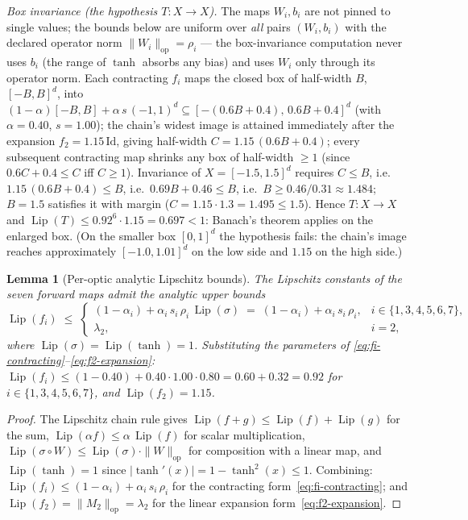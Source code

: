 \documentclass[11pt,a4paper]{article}
\theoremstyle{plain}
\newtheorem{lemma}[theorem]{Lemma}
\theoremstyle{definition}
\theoremstyle{remark}
\DeclareMathOperator{\Lip}{Lip}
\begin{document}
\emph{Box invariance (the hypothesis $T:X\to X$).} The maps
$W_{i}, b_{i}$ are not pinned to single values; the bounds below are
uniform over \emph{all} pairs $(W_{i}, b_{i})$ with the declared
operator norm $\|W_{i}\|_{\mathrm{op}}=\rho_{i}$ --- the
box-invariance computation never uses $b_{i}$ (the range of
$\tanh$ absorbs any bias) and uses $W_{i}$ only through its operator
norm. Each contracting $f_{i}$ maps the closed box of half-width
$B$, $[-B,B]^{d}$, into
$(1-\alpha)[-B,B]+\alpha\,s\,(-1,1)^{d}\subseteq
[-(0.6B+0.4),\,0.6B+0.4]^{d}$ (with $\alpha=0.40$, $s=1.00$); the
chain's widest image is attained immediately after the expansion
$f_{2}=1.15\,\mathrm{Id}$, giving half-width
$C=1.15\,(0.6B+0.4)$; every subsequent contracting map shrinks any
box of half-width $\geq 1$ (since $0.6C+0.4\leq C$ iff $C\geq 1$).
Invariance of $X=[-1.5,1.5]^{d}$ requires $C\leq B$, i.e.\
$1.15\,(0.6B+0.4)\leq B$, i.e.\ $0.69B+0.46\leq B$, i.e.\
$B\geq 0.46/0.31\approx 1.484$; $B=1.5$ satisfies it with margin
($C=1.15\cdot 1.3=1.495\leq 1.5$). Hence $T:X\to X$ and
$\Lip(T)\leq 0.92^{6}\cdot 1.15=0.697<1$: Banach's theorem applies
on the enlarged box. (On the smaller box $[0,1]^{d}$ the hypothesis
fails: the chain's image reaches approximately $[-1.0,1.01]^{d}$ on
the low side and $1.15$ on the high side.)

\begin{lemma}[Per-optic analytic Lipschitz bounds]
\label{lem:lip-per-optic}
The Lipschitz constants of the seven forward maps admit the analytic
upper bounds
\begin{equation}\label{eq:lip-per-optic}
  \Lip(f_{i}) \;\leq\;
  \begin{cases}
  (1-\alpha_{i})+\alpha_{i}\,s_{i}\,\rho_{i}\,\Lip(\sigma)
   \;=\; (1-\alpha_{i})+\alpha_{i}\,s_{i}\,\rho_{i},
   & i\in\{1,3,4,5,6,7\},\\[4pt]
  \lambda_{2}, & i=2,
  \end{cases}
\end{equation}
where $\Lip(\sigma)=\Lip(\tanh)=1$. Substituting the parameters of
\eqref{eq:fi-contracting}--\eqref{eq:f2-expansion}:
$\Lip(f_{i})\leq (1-0.40)+0.40\cdot 1.00\cdot 0.80 = 0.60+0.32=0.92$
for $i\in\{1,3,4,5,6,7\}$, and $\Lip(f_{2})=1.15$.
\end{lemma}

\begin{proof}
The Lipschitz chain rule gives $\Lip(f+g)\leq \Lip(f)+\Lip(g)$ for the
sum, $\Lip(\alpha f)\leq \alpha\,\Lip(f)$ for scalar multiplication,
$\Lip(\sigma\circ W)\leq \Lip(\sigma)\cdot\|W\|_{\mathrm{op}}$ for
composition with a linear map, and $\Lip(\tanh)=1$ since
$|\tanh'(x)|=1-\tanh^{2}(x)\leq 1$. Combining:
$\Lip(f_{i})\leq (1-\alpha_{i})+\alpha_{i}\,s_{i}\,\rho_{i}$ for the
contracting form~\eqref{eq:fi-contracting}; and $\Lip(f_{2})=
\|M_{2}\|_{\mathrm{op}}=\lambda_{2}$ for the linear expansion
form~\eqref{eq:f2-expansion}.
\end{proof}
\end{document}
